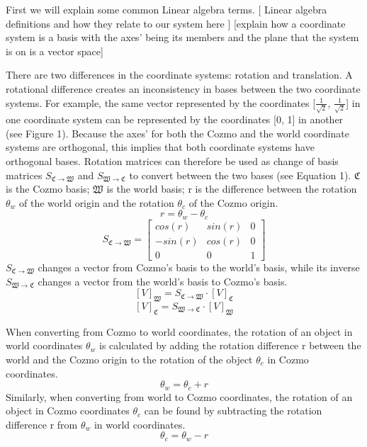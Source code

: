 \documentclass[jou,apacite]{apa6}
\begin{document}
First we will explain some common Linear algebra terms. 
[ Linear algebra definitions and how they relate to our system here ]
[explain how a coordinate system is a basis with the axes’ being its members and the plane that the system is on is a vector space]

There are two differences in the coordinate systems: rotation and translation. A rotational difference creates an inconsistency in bases between the two coordinate systems. For example, the same vector represented by the coordinates [$\frac{1}{\sqrt2}$, $\frac{1}{\sqrt2}$] in one coordinate system can be represented by the coordinates [0, 1] in another (see Figure 1). Because the axes’ for both the Cozmo and the world coordinate systems are orthogonal, this implies that both coordinate systems have orthogonal bases. Rotation matrices can therefore be used as change of basis matrices $S_{\mathfrak{C}\rightarrow\mathfrak{W}}$ and $S_{\mathfrak{W}\rightarrow\mathfrak{C}}$ to convert between the two bases (see Equation 1). $\mathfrak{C}$ is the Cozmo basis; $\mathfrak{W}$ is the world basis; r is the difference between the rotation $\theta_w$ of the world origin and the rotation $\theta_c$ of the Cozmo origin.
$$r = \theta_w - \theta_c$$
\[
S_{\mathfrak{C}\rightarrow\mathfrak{W}}=
\begin{bmatrix}
cos(r) & sin(r) & 0 \\
-sin(r) & cos(r) & 0 \\
0 & 0 & 1
\end{bmatrix}
\]
$S_{\mathfrak{C}\rightarrow\mathfrak{W}}$ changes a vector from Cozmo's basis to the world's basis, while its inverse $S_{\mathfrak{W}\rightarrow\mathfrak{C}}$ changes a vector from the world's basis to Cozmo's basis.
 $$[V]_\mathfrak{W} = S_{\mathfrak{C}\rightarrow\mathfrak{W}} \cdot [V]_\mathfrak{C}$$
 $$[V]_\mathfrak{C} = S_{\mathfrak{W}\rightarrow\mathfrak{C}} \cdot [V]_\mathfrak{W}$$

When converting from Cozmo to world coordinates, the rotation of an object in world coordinates $\theta_w$ is calculated by adding the rotation difference r between the world and the Cozmo origin to the rotation of the object $\theta_c$ in Cozmo coordinates.
$$\theta_w = \theta_c + r$$
Similarly, when converting from world to Cozmo coordinates, the rotation of an object in Cozmo coordinates $\theta_c$ can be found by subtracting the rotation difference r from $\theta_w$ in world coordinates.
$$\theta_c = \theta_w - r$$
\end{document}
